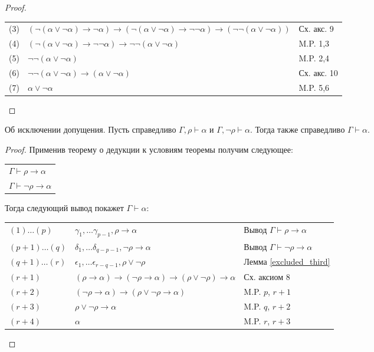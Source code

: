 \begin{proof}
\begin{enumerate}
\begin{tabular}{lll}
(3) & $(\neg(\alpha\vee\neg\alpha) \rightarrow \neg\alpha) \rightarrow (\neg(\alpha\vee\neg\alpha) \rightarrow \neg\neg\alpha) \rightarrow (\neg\neg(\alpha\vee\neg\alpha))$ & Сх. акс. 9\\
(4) & $(\neg(\alpha\vee\neg\alpha) \rightarrow \neg\neg\alpha) \rightarrow \neg\neg(\alpha\vee\neg\alpha)$ & M.P. 1,3\\
(5) & $\neg\neg(\alpha\vee\neg\alpha)$ & M.P. 2,4\\
(6) & $\neg\neg(\alpha\vee\neg\alpha) \rightarrow (\alpha\vee\neg\alpha)$ & Сх. акс. 10\\
(7) & $\alpha\vee\neg\alpha$ & M.P. 5,6
\end{tabular}
\end{enumerate}

\end{proof}

\begin{lemma}{Об исключении допущения.}
Пусть справедливо $\Gamma, \rho \vdash \alpha$ и $\Gamma, \neg \rho \vdash \alpha$.
Тогда также справедливо $\Gamma \vdash \alpha$.
\end{lemma}

\begin{proof}

Применив теорему о дедукции к условиям теоремы получим следующее:

\begin{tabular}{l}
$\Gamma \vdash \rho \rightarrow \alpha$\\
$\Gamma \vdash \neg \rho \rightarrow \alpha$
\end{tabular}

Тогда следующий вывод покажет $\Gamma \vdash \alpha$:

\begin{tabular}{lll}
$(1) \dots (p)$ & $\gamma_1, \dots \gamma_{p-1}, \rho \rightarrow \alpha$ & Вывод $\Gamma \vdash \rho \rightarrow \alpha$\\
$(p+1) \dots (q)$ & $\delta_1, \dots \delta_{q-p-1}, \neg \rho \rightarrow \alpha$ & Вывод $\Gamma \vdash \neg \rho \rightarrow \alpha$\\
$(q+1) \dots (r)$ & $\epsilon_1, \dots \epsilon_{r-q-1}, \rho \vee \neg \rho$ & Лемма \ref{excluded_third}\\
$(r+1)$ & $(\rho \rightarrow \alpha) \rightarrow (\neg \rho \rightarrow \alpha) \rightarrow (\rho \vee \neg \rho) \rightarrow \alpha$ & Сх. аксиом 8\\
$(r+2)$ & $(\neg \rho \rightarrow \alpha) \rightarrow (\rho \vee \neg \rho \rightarrow \alpha)$ & M.P. $p$, $r+1$\\
$(r+3)$ & $\rho \vee \neg \rho \rightarrow \alpha$ & M.P. $q$, $r+2$\\
$(r+4)$ & $\alpha$ & M.P. $r$, $r+3$
\end{tabular}

\end{proof}

